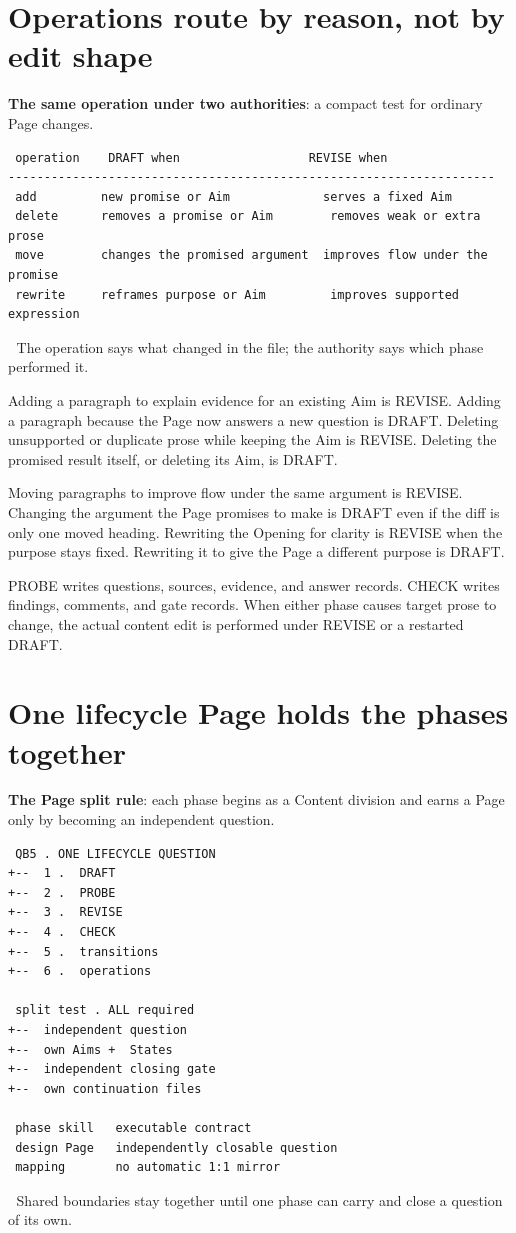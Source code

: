 \section{Operations route by reason, not by edit shape}
\textbf{The same operation under two authorities}: a compact test for ordinary Page changes.

\begin{verbatim}
 operation    DRAFT when                  REVISE when
--------------------------------------------------------------------
 add         new promise or Aim             serves a fixed Aim
 delete      removes a promise or Aim        removes weak or extra prose
 move        changes the promised argument  improves flow under the promise
 rewrite     reframes purpose or Aim         improves supported expression
\end{verbatim}
📌 The operation says what changed in the file; the authority says which phase performed it.

Adding a paragraph to explain evidence for an existing Aim is REVISE. Adding a paragraph because the Page now answers a new question is DRAFT. Deleting unsupported or duplicate prose while keeping the Aim is REVISE. Deleting the promised result itself, or deleting its Aim, is DRAFT.

Moving paragraphs to improve flow under the same argument is REVISE. Changing the argument the Page promises to make is DRAFT even if the diff is only one moved heading. Rewriting the Opening for clarity is REVISE when the purpose stays fixed. Rewriting it to give the Page a different purpose is DRAFT.

PROBE writes questions, sources, evidence, and answer records. CHECK writes findings, comments, and gate records. When either phase causes target prose to change, the actual content edit is performed under REVISE or a restarted DRAFT.


\section{One lifecycle Page holds the phases together}
\textbf{The Page split rule}: each phase begins as a Content division and earns a Page only by becoming an independent question.

\begin{verbatim}
 QB5 . ONE LIFECYCLE QUESTION
+--  1 .  DRAFT
+--  2 .  PROBE
+--  3 .  REVISE
+--  4 .  CHECK
+--  5 .  transitions
+--  6 .  operations

 split test . ALL required
+--  independent question
+--  own Aims +  States
+--  independent closing gate
+--  own continuation files

 phase skill   executable contract
 design Page   independently closable question
 mapping       no automatic 1:1 mirror
\end{verbatim}
📌 Shared boundaries stay together until one phase can carry and close a question of its own.

